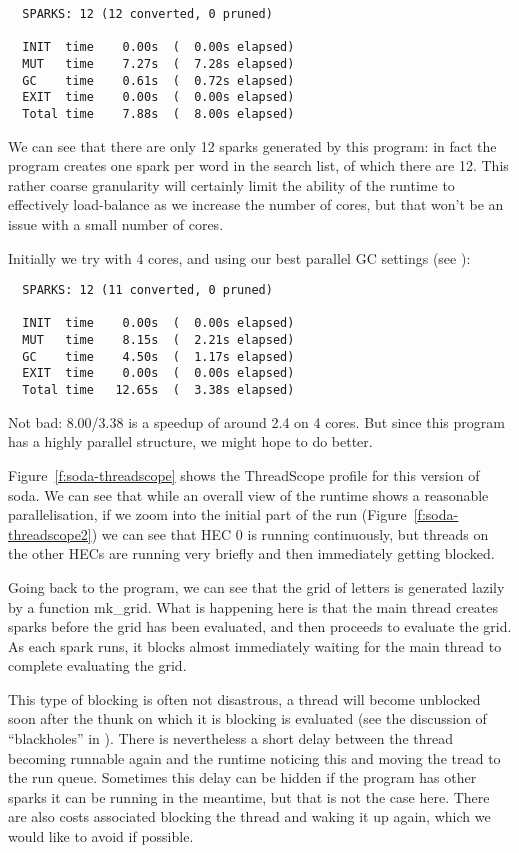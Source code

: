 \documentclass[twocolumn,9pt]{sigplanconf}
\newcommand{\codef}[1]{{\fontfamily{cmss}\small#1}}
\begin{document}
\begin{verbatim}
  SPARKS: 12 (12 converted, 0 pruned)

  INIT  time    0.00s  (  0.00s elapsed)
  MUT   time    7.27s  (  7.28s elapsed)
  GC    time    0.61s  (  0.72s elapsed)
  EXIT  time    0.00s  (  0.00s elapsed)
  Total time    7.88s  (  8.00s elapsed)
\end{verbatim}

We can see that there are only 12 sparks generated by this program: in
fact the program creates one spark per word in the search list, of
which there are 12.  This rather coarse granularity will certainly
limit the ability of the runtime to effectively load-balance as we
increase the number of cores, but that won't be an issue with a small
number of cores.

Initially we try with 4 cores, and using our best parallel GC settings
(see \cite{multicore-ghc}):

\begin{verbatim}
  SPARKS: 12 (11 converted, 0 pruned)

  INIT  time    0.00s  (  0.00s elapsed)
  MUT   time    8.15s  (  2.21s elapsed)
  GC    time    4.50s  (  1.17s elapsed)
  EXIT  time    0.00s  (  0.00s elapsed)
  Total time   12.65s  (  3.38s elapsed)
\end{verbatim}

Not bad: 8.00/3.38 is a speedup of around 2.4 on 4 cores.  But since
this program has a highly parallel structure, we might hope to do
better.  

Figure~\ref{f:soda-threadscope} shows the ThreadScope profile for this
version of soda.  We can see that while an overall view of the runtime
shows a reasonable parallelisation, if we zoom into the initial part
of the run (Figure~\ref{f:soda-threadscope2}) we can see that HEC 0 is
running continuously, but threads on the other HECs are running very
briefly and then immediately getting blocked.

Going back to the program, we can see that the grid of letters is
generated lazily by a function \codef{mk\_grid}.  What is happening here is
that the main thread creates sparks before the grid has been
evaluated, and then proceeds to evaluate the grid.  As each spark
runs, it blocks almost immediately waiting for the main thread to
complete evaluating the grid.

This type of blocking is often not disastrous, a thread will become
unblocked soon after the thunk on which it is blocking is evaluated
(see the discussion of ``blackholes'' in \cite{multicore-ghc}).  There
is nevertheless a short delay between the thread becoming runnable
again and the runtime noticing this and moving the tread to the run
queue.  Sometimes this delay can be hidden if the program has other
sparks it can be running in the meantime, but that is not the case
here.  There are also costs associated blocking the thread and waking
it up again, which we would like to avoid if possible.
\end{document}
